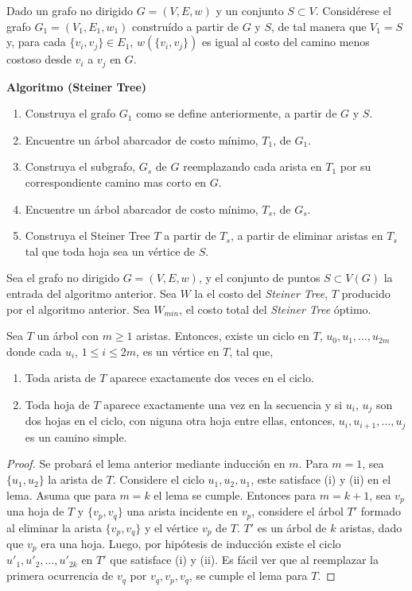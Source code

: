 \documentclass[../np-approximations.tex]{subfiles}
\begin{document}
Dado un grafo no dirigido $G=(V,E,w)$ y un conjunto $S\subset V$. Considérese el grafo $G_1=(V_1,E_1,w_1)$ construído a partir de $G$ y $S$, de tal manera que $V_1=S$
y, para cada $\{v_i,v_j\}\in E_1$, $w(\{v_i,v_j\})$ es igual al costo del camino menos costoso desde $v_i$ a $v_j$ en $G$.

\bigskip
\begin{tcolorbox}
	\textbf{Algoritmo (Steiner Tree)}
	\begin{enumerate}
		\item Construya el grafo $G_1$ como se define anteriormente, a partir de $G$ y $S$.
		\item Encuentre un árbol abarcador de costo mínimo, $T_1$, de $G_1$.
		\item Construya el subgrafo, $G_s$ de $G$ reemplazando cada arista en $T_1$ por su correspondiente camino mas corto en $G$.
		\item Encuentre un árbol abarcador de costo mínimo, $T_s$, de $G_s$.
		\item Construya el Steiner Tree $T$ a partir de $T_s$, a partir de eliminar aristas en $T_s$ tal que toda hoja sea un vértice de $S$.
	\end{enumerate}
\end{tcolorbox}
\bigskip

Sea el grafo no dirigido $G=(V,E,w)$, y el conjunto de puntos 
$S\subset V(G)$ la entrada del algoritmo anterior. Sea $W$ la el 
costo del \emph{Steiner Tree}, $T$ producido por el algoritmo 
anterior. Sea $W_{min}$, el costo total del \emph{Steiner Tree} 
óptimo.

\begin{lemma}
	Sea $T$ un árbol con $m \ge 1$ aristas. Entonces, existe un 
	ciclo en $T$, $u_0, u_1, \dots, u_{2m}$ donde cada $u_i$,
	$1 \le i \le 2m$, es un vértice en $T$, tal que,
	\renewcommand{\theenumi}{\roman{enumi}}
	\begin{enumerate}
		\item Toda arista de $T$ aparece exactamente dos veces en 
		      el ciclo.
		\item Toda hoja de $T$ aparece exactamente una vez en la 
		      secuencia y si $u_i$, $u_j$ son dos hojas en el ciclo,
		      con niguna otra hoja entre ellas, entonces,
		      $u_i, u_{i+1}, \dots, u_j$ es un camino simple.
	\end{enumerate}
\end{lemma}

\begin{proof}
	Se probará el lema anterior mediante inducción en $m$. Para 
	$m=1$, sea $\{u_1, u_2\}$ la arista de $T$. Considere el ciclo
	$u_1,u_2,u_1$, este satisface (i) y (ii) en el lema. Asuma que 
	para $m=k$ el lema se cumple. Entonces para $m=k+1$, sea $v_p$ 
	una hoja de $T$ y $\{v_p,v_q\}$ una arista incidente en $v_p$, 
	considere el árbol $T'$ formado al eliminar la arista
	$\{v_p,v_q\}$ y el vértice $v_p$ de $T$. $T'$ es un árbol de 
	$k$ aristas, dado que $v_p$ era una hoja. Luego, por hipótesis 
	de inducción existe el ciclo $u'_1,u'_2,\dots,u'_{2k}$ en $T'$ 
	que satisface (i) y (ii). Es fácil ver que al reemplazar la 
	primera ocurrencia de $v_q$ por $v_q,v_p,v_q$, se cumple el 
	lema para $T$.
\end{proof}
\end{document}

